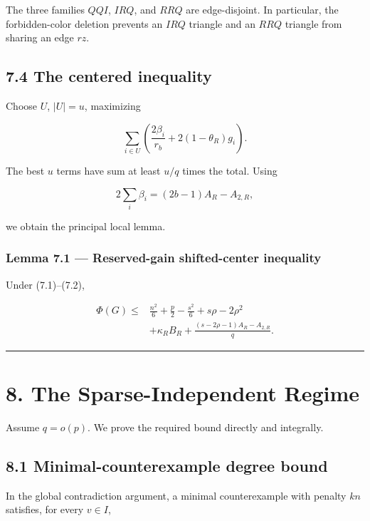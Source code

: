 \documentclass[
  11pt,
]{article}
\begin{document}
The three families \(QQI\), \(IRQ\), and \(RRQ\) are edge-disjoint. In
particular, the forbidden-color deletion prevents an \(IRQ\) triangle
and an \(RRQ\) triangle from sharing an edge \(rz\).

\subsection{7.4 The centered inequality}\label{the-centered-inequality}

Choose \(U\), \(|U|=u\), maximizing

\[
\sum_{i\in U}
\left(
\frac{2\beta_i}{r_b}+2(1-\theta_R)g_i
\right).
\]

The best \(u\) terms have sum at least \(u/q\) times the total. Using

\[
2\sum_i\beta_i
=(2b-1)A_R-A_{2,R},
\]

we obtain the principal local lemma.

\subsubsection{Lemma 7.1 --- Reserved-gain shifted-center
inequality}\label{lemma-7.1-reserved-gain-shifted-center-inequality}

Under (7.1)--(7.2),

\[
\boxed{
\begin{aligned}
\Phi(G)
\le{}&
\frac{n^2}{6}+\frac p2-\frac{s^2}{6}
+s\rho-2\rho^2\\
&+
\kappa_RB_R
+
\frac{(s-2\rho-1)A_R-A_{2,R}}q.
\end{aligned}
}
\tag{7.6}
\]

\begin{center}\rule{0.5\linewidth}{0.5pt}\end{center}

\section{8. The Sparse-Independent
Regime}\label{the-sparse-independent-regime}

Assume \(q=o(p)\). We prove the required bound directly and integrally.

\subsection{8.1 Minimal-counterexample degree
bound}\label{minimal-counterexample-degree-bound}

In the global contradiction argument, a minimal counterexample with
penalty \(kn\) satisfies, for every \(v\in I\),
\end{document}
